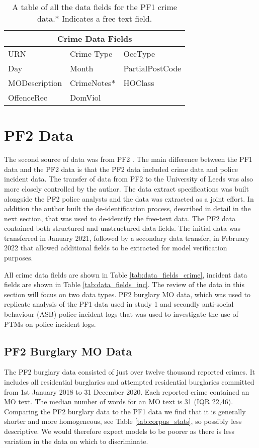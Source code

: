 \begin{table}[]
\centering
\begin{tabular}{@{}lll@{}}
\toprule
\multicolumn{3}{c}{Crime Data Fields}                          \\ \midrule
URN & Crime Type       & OccType      \\
Day           & Month          & PartialPostCode                \\
MODescription & CrimeNotes*             & HOClass            \\
OffenceRec  &  DomViol          &           \\ \bottomrule
\end{tabular}
\caption[Table of data fields for the PF1 data]{\label{tab:data_fields_PF1} A table of all the data fields for the PF1 crime data.* Indicates a free text field.}
\end{table}


\section{PF2 Data} The second source of data was from PF2 . The main difference between the PF1 data and the PF2 data is that the PF2 data included crime data and police incident data. The transfer of data from PF2 to the University of Leeds was also more closely controlled by the author. The data extract specifications was built alongside the PF2 police analysts and the data was extracted as a joint effort. In addition the author built the de-identification process, described in detail in the next section, that was used to de-identify the free-text data. The PF2 data contained both structured and unstructured data fields. The initial data was transferred in January 2021, followed by a secondary data transfer, in February 2022 that allowed additional fields to be extracted for model verification purposes. 

All crime data fields are shown in Table \ref{tab:data_fields_crime}, incident data fields are shown in Table \ref{tab:data_fields_inc}. The review of the data in this section will focus on two data types. PF2 burglary MO data, which was used to replicate analysis of the PF1 data used in study 1 and secondly anti-social behaviour (ASB) police incident logs that was used to investigate the use of PTMs on police incident logs.




\subsection{PF2 Burglary MO Data} The PF2 burglary data consisted of just over twelve thousand reported crimes. It includes all residential burglaries and attempted residential burglaries committed from 1st January 2018 to 31 December 2020. Each reported crime contained an MO text. The median number of words for an MO text is 31 (IQR 22,46). Comparing the PF2 burglary data to the PF1 data we find that it is generally shorter and more homogeneous, see Table \ref{tab:corpus_stats}, so possibly less descriptive. We would therefore expect models to be poorer as there is less variation in the data on which to discriminate. 


